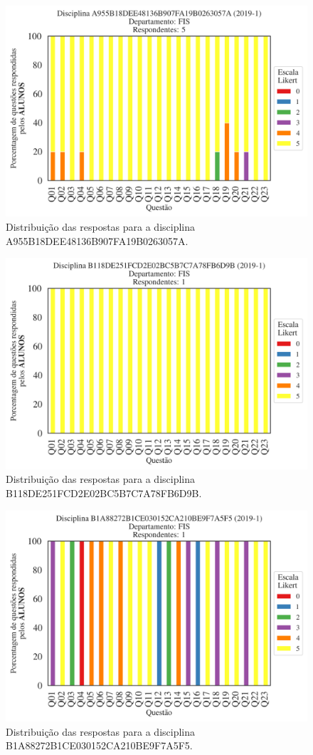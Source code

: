 \documentclass[a4paper,10pt]{article}
\begin{document}
\begin{figure}[h]
\centering
\includegraphics[width=0.485\linewidth]{analise_disciplina_departamento_FIS_ALUNO_TURMA_A955B18DEE48136B907FA19B0263057A.png}
\caption{\label{fig:analise_geral_departamento}                Distribuição das respostas para a disciplina A955B18DEE48136B907FA19B0263057A.}
\end{figure}
\begin{figure}[h]
\centering
\includegraphics[width=0.485\linewidth]{analise_disciplina_departamento_FIS_ALUNO_TURMA_B118DE251FCD2E02BC5B7C7A78FB6D9B.png}
\caption{\label{fig:analise_geral_departamento}                Distribuição das respostas para a disciplina B118DE251FCD2E02BC5B7C7A78FB6D9B.}
\end{figure}
\begin{figure}[h]
\centering
\includegraphics[width=0.485\linewidth]{analise_disciplina_departamento_FIS_ALUNO_TURMA_B1A88272B1CE030152CA210BE9F7A5F5.png}
\caption{\label{fig:analise_geral_departamento}                Distribuição das respostas para a disciplina B1A88272B1CE030152CA210BE9F7A5F5.}
\end{figure}
\end{document}
